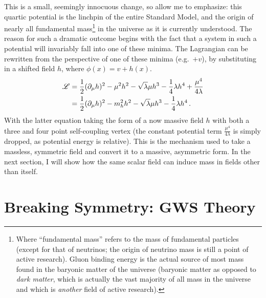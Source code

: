     This is a small, seemingly innocuous change, so allow me to emphasize:
        this quartic potential is the linchpin of the entire Standard Model,
        and the origin of nearly all fundamental mass\footnote{
            Where ``fundamental mass'' refers to the mass of fundamental particles
                (except for that of neutrinos; the origin of neutrino mass is still a point of active research).
            Gluon binding energy is the actual source of most mass found in the baryonic matter of the universe
                (baryonic matter as opposed to \textit{dark matter},
                which is actually the vast majority of all mass in the universe
                and which is \textit{another} field of active research).
        } in the universe as it is currently understood.
    The reason for such a dramatic outcome begins with the fact that
        a system in such a potential will invariably fall into one of these minima.
    The Lagrangian can be rewritten from the perspective of one of these minima (e.g.\ $+v$),
        by substituting in a shifted field $h$, where $\phi(x)=v+h(x)$.
    \begin{equation} \begin{split} \label{eq:basic_higgs}
        \mathscr{L} & = \frac{1}{2} (\partial_{\mu} h)^2
            - \mu^2 h^2
            -\sqrt{\lambda} \mu h^3
            - \frac{1}{4} \lambda h^4 
            + \frac{\mu^4}{4 \lambda} \\
         & = \frac{1}{2} (\partial_{\mu} h)^2
            - m^2_{h} h^2
            -\sqrt{\lambda} \mu h^3
            - \frac{1}{4} \lambda h^4
        \,.
    \end{split} \end{equation}
    With the latter equation taking the form of a now massive field $h$ with both a three and four point self-coupling vertex
        (the constant potential term $\frac{\mu^4}{4 \lambda}$ is simply dropped, as potential energy is relative).
    This is the mechanism used to take a massless, symmetric field and convert it to a massive, asymmetric form.
    In the next section, I will show how the same scalar field can induce mass in fields other than itself.



\section{Breaking Symmetry: GWS Theory}

